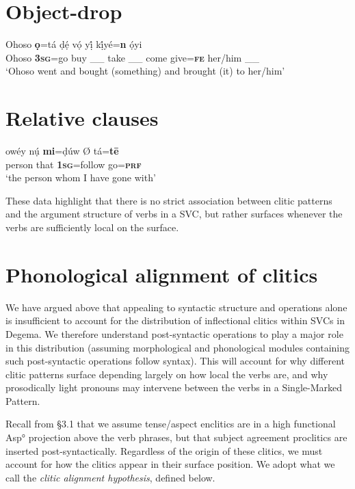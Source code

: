 \chapter[Object{}-drop]{Object-drop}
\label{bkm:Ref449460495}\gll Ohoso \textbf{  ọ}=tá   ḍẹ́     vọ́     yị́    kị́yé=\textbf{n }  ọ́yi\\
     Ohoso   \textbf{3}\textbf{\textsc{sg}}=go   buy   \_\_  take \_\_  come   give=\textbf{\textsc{fe}}  her/him  \_\_\\
\glt ‘Ohoso went and bought (something) and brought (it) to her/him’ \citep[121]{Kari2004}
\z

\chapter[Relative clauses ]{Relative clauses }
\label{bkm:Ref449460499}\gll owéy     nụ́     \textbf{mi}=ḍúw\textbf{     }Ø\textbf{  }tá=\textbf{t\={e}}\\
     person    that    \textbf{\textsc{1sg}}=follow    go=\textbf{\textsc{prf}}\\
\glt ‘the person whom I have gone with’
\z

These data highlight that there is no strict association between clitic patterns and the argument structure of verbs in a SVC, but rather surfaces whenever the verbs are sufficiently local on the surface. 

\chapter{Phonological alignment of clitics }

We have argued above that appealing to syntactic structure and operations alone is insufficient to account for the distribution of inflectional clitics within SVCs in Degema. We therefore understand post-syntactic operations to play a major role in this distribution (assuming morphological and phonological modules containing such post-syntactic operations follow syntax). This will account for why different clitic patterns surface depending largely on how local the verbs are, and why prosodically light pronouns may intervene between the verbs in a Single-Marked Pattern. 

Recall from §3.1 that we assume tense/aspect enclitics are in a high functional Asp° projection above the verb phrases, but that subject agreement proclitics are inserted post-syntactically. Regardless of the origin of these clitics, we must account for how the clitics appear in their surface position. We adopt what we call the \textit{clitic alignment hypothesis}, defined below. 

